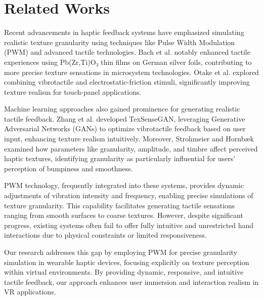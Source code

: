 \documentclass[graybox]{svmult}
\begin{document}
\section{Related Works}\label{sec:nssdn}
Recent advancements in haptic feedback systems have emphasized simulating realistic texture granularity using techniques like Pulse Width Modulation (PWM) and advanced tactile technologies. Bach et al. \cite{bach2023enhanced} notably enhanced tactile experiences using Pb(Zr,Ti)O₃ thin films on German silver foils, contributing to more precise texture sensations in microsystem technologies. Otake et al. \cite{otake2022vibrotactile} explored combining vibrotactile and electrostatic-friction stimuli, significantly improving texture realism for touch-panel applications.

Machine learning approaches also gained prominence for generating realistic tactile feedback. Zhang et al. \cite{zhang2025texsensegan} developed TexSenseGAN, leveraging Generative Adversarial Networks (GANs) to optimize vibrotactile feedback based on user input, enhancing texture realism intuitively. Moreover, Strohmeier and Hornbæk \cite{strohmeier2017generating} examined how parameters like granularity, amplitude, and timbre affect perceived haptic textures, identifying granularity as particularly influential for users' perception of bumpiness and smoothness.

PWM technology, frequently integrated into these systems, provides dynamic adjustments of vibration intensity and frequency, enabling precise simulations of texture granularity. This capability facilitates generating tactile sensations ranging from smooth surfaces to coarse textures. However, despite significant progress, existing systems often fail to offer fully intuitive and unrestricted hand interactions due to physical constraints or limited responsiveness.

Our research addresses this gap by employing PWM for precise granularity simulation in wearable haptic devices, focusing explicitly on texture perception within virtual environments. By providing dynamic, responsive, and intuitive tactile feedback, our approach enhances user immersion and interaction realism in VR applications.
\end{document}
